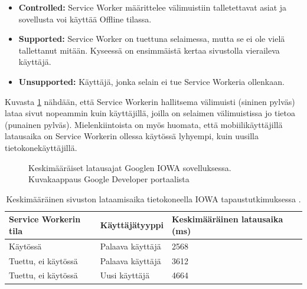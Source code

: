 \documentclass{tktltiki}
\begin{document}
\begin{itemize}
  \item \textbf{Controlled:} Service Worker määrittelee välimuistiin talletettavat asiat ja sovellusta voi käyttää Offline tilassa.
  \item \textbf{Supported:} Service Worker on tuettuna selaimessa, mutta se ei ole vielä tallettanut mitään. Kyseessä on ensimmäistä kertaa sivustolla vieraileva käyttäjä.
  \item \textbf{Unsupported:} Käyttäjä, jonka selain ei tue Service Workeria ollenkaan. 
\end{itemize}

Kuvasta \ref{Google AVG load times} nähdään, että Service Workerin hallitsema välimuisti (sininen pylväs) lataa sivut nopeammin kuin käyttäjillä, joilla on selaimen välimuistissa jo tietoa (punainen pylväs). Mielenkiintoista on myös huomata, että mobiilikäyttäjillä latausaika on Service Workerin ollessa käytössä lyhyempi, kuin uusilla tietokonekäyttäjillä. 

\begin{figure}[!htbp]
\begin{center}
\caption{Keskimääräiset latausajat Googlen IOWA sovelluksessa. Kuvakaappaus Google Developer portaalista \cite{Walton}}
\label{Google AVG load times}
\end{center}
\end{figure}


\begin{table}[!htbp]
\centering
\begin{small}
\begin{tabular}{|L{5cm}|L{4cm}|L{4cm}|}
\hline
\textbf{Service Workerin tila} & 
\textbf{Käyttäjätyyppi} &
\textbf{Keskimääräinen latausaika (ms)}
\\ \hline
Käytössä & 
Palaava käyttäjä &
2568
\\ \hline
Tuettu, ei käytössä & 
Palaava käyttäjä &
3612
\\ \hline
Tuettu, ei käytössä & 
Uusi käyttäjä &
4664
\\ \hline
\end{tabular}
\caption{Keskimääräinen sivuston lataamisaika tietokoneella IOWA tapaustutkimuksessa \cite{Walton}. }
\label{table:loading time on pc}
\end{small}
\end{table}

\clearpage
\end{document}
